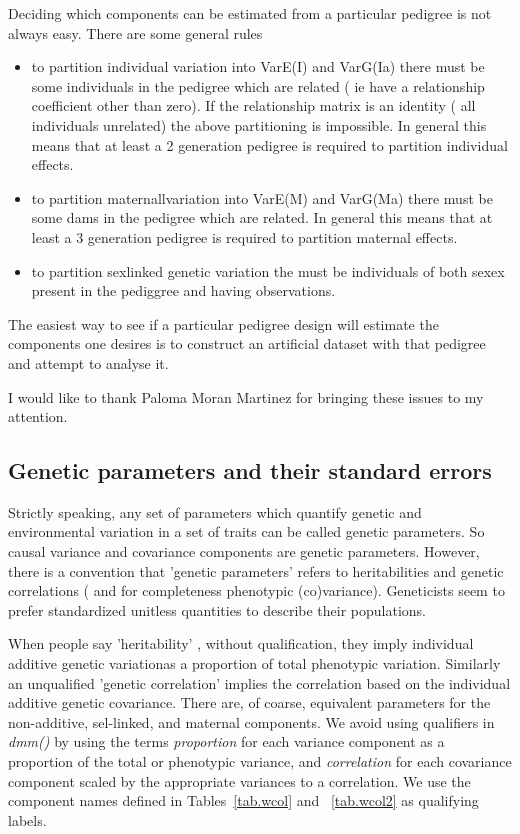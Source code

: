 \documentclass[titlepage]{article}  %
\begin{document}
Deciding which components can be estimated from a particular pedigree is not always easy. There are some general rules
\begin{itemize}
\item to partition individual variation into VarE(I) and VarG(Ia) there must be some individuals in the pedigree which are related ( ie have a relationship coefficient other than zero). If the relationship matrix is an identity ( all individuals unrelated) the above partitioning is impossible. In general this means that at least a 2 generation pedigree is required to partition individual effects.
\item to partition maternallvariation into VarE(M) and VarG(Ma) there must be some dams in the pedigree which are related. In general this means that at least a 3 generation pedigree is required to partition maternal effects.
\item to partition sexlinked genetic variation the must be individuals of both sexex present in the pediggree and having observations.
\end{itemize}

The easiest way to see if a particular pedigree design will estimate the components one desires is to construct an artificial dataset with that pedigree and attempt to analyse it.

I would like to thank Paloma Moran Martinez for bringing these issues to my attention.

\clearpage
\subsection{Genetic parameters and their standard errors}
Strictly speaking, any set of parameters which quantify genetic and environmental variation in a set of traits can be called genetic parameters. So causal variance and covariance components are genetic parameters. However, there is a convention that 'genetic parameters' refers to heritabilities and genetic correlations ( and for completeness phenotypic (co)variance). Geneticists seem to prefer standardized unitless quantities to describe their populations.
 
 When people say 'heritability' , without qualification, they imply individual additive genetic variationas a proportion of total phenotypic variation. Similarly an unqualified 'genetic correlation' implies the correlation based on the individual additive genetic covariance. There are, of coarse, equivalent parameters for the non-additive, sel-linked, and maternal components. We avoid using qualifiers in {\em dmm()} by using the terms {\em proportion} for each variance component as a proportion of the total or phenotypic variance, and {\em correlation} for each covariance component scaled by the appropriate variances to a correlation. We use the component names defined in Tables~\ref{tab.wcol} and ~\ref{tab.wcol2} as qualifying labels.
\end{document}
